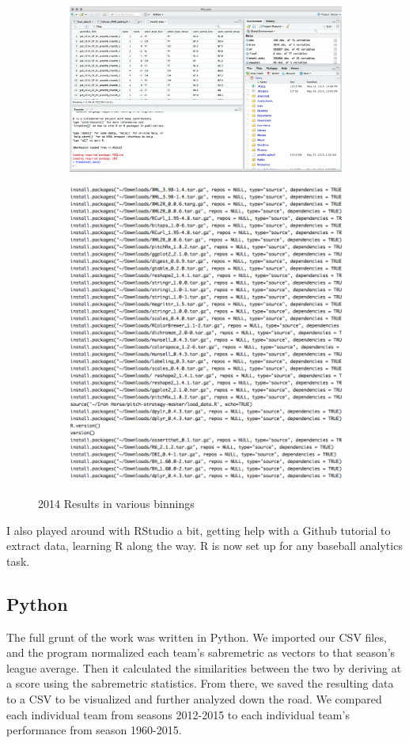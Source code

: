 \documentclass[12pt]{article}
\numberwithin{equation}{subsection}
\begin{document}
\begin{figure}[H] 
  \begin{subfigure}[b]{0.5\linewidth}
    \centering
    \includegraphics[width=0.7\linewidth]{rstudio} 
    \captionsetup{justification=centering}
    \label{fig2:a} 
    \vspace{4ex}
  \end{subfigure}%
  \begin{subfigure}[b]{0.5\linewidth}
    \centering
    \includegraphics[width=0.7\linewidth]{rpackages} 
    \captionsetup{justification=centering}
    \label{fig2:b} 
    \vspace{4ex}
  \end{subfigure} 
  \caption{2014 Results in various binnings}
\end{figure}

I also played around with RStudio a bit, getting help with a Github tutorial to extract data, learning R along the way. R is now set up for any baseball analytics task.

\subsection{Python} %
The full grunt of the work was written in Python. We imported our CSV files, and the program normalized each team's sabremetric as vectors to that season's league average. Then it calculated the similarities between the two by deriving at a score using the sabremetric statistics. From there, we saved the resulting data to a CSV to be visualized and further analyzed down the road. We compared each individual team from seasons 2012-2015 to each individual team's performance from season 1960-2015. 
\end{document}
